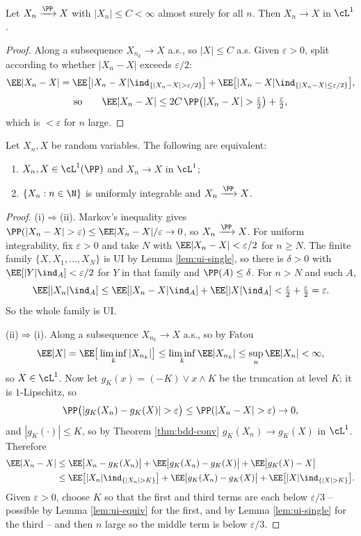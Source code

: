 \begin{theorem}\label{thm:bdd-conv}
	Let $X_n\xrightarrow{\PP}X$ with $|X_n| \leq C < \infty$ almost surely for all $n$. Then $X_n \to X$ in $\cL^1$.
\end{theorem}
\begin{proof}
	Along a subsequence $X_{n_k}\to X$ a.s., so $|X|\leq C$ a.s. Given $\varepsilon>0$, split according to whether $|X_n - X|$ exceeds $\varepsilon/2$:
	$$
	\EE|X_n - X| = \EE\big[|X_n-X|\ind_{\{|X_n-X|>\varepsilon/2\}}\big]+\EE\big[|X_n-X|\ind_{\{|X_n-X|\leq\varepsilon/2\}}\big],
	$$
	$$
	\text{so} \qquad \EE|X_n-X| \leq 2C\,\PP\big(|X_n-X|>\tfrac\varepsilon2\big)+\tfrac\varepsilon2,
	$$
	which is $<\varepsilon$ for $n$ large.
\end{proof}

\begin{theorem}\label{thm:vitali}
	Let $X_n, X$ be random variables. The following are equivalent:
	\begin{enumerate}[label=(\roman*)]
		\item $X_n, X \in \cL^1(\PP)$ and $X_n \to X$ in $\cL^1$;
		\item $\{X_n : n \in\N\}$ is uniformly integrable and $X_n \xrightarrow{\PP} X$.
	\end{enumerate}
\end{theorem}
\begin{proof}
	(i)$\Rightarrow$(ii). Markov's inequality gives $\PP(|X_n-X|>\varepsilon)\leq \EE|X_n-X|/\varepsilon\to0$, so $X_n\xrightarrow{\PP}X$. For uniform integrability, fix $\varepsilon>0$ and take $N$ with $\EE|X_n - X|<\varepsilon/2$ for $n \geq N$. The finite family $\{X, X_1,\dots,X_N\}$ is UI by Lemma \ref{lem:ui-single}, so there is $\delta>0$ with $\EE[|Y|\ind_A]<\varepsilon/2$ for $Y$ in that family and $\PP(A)\leq\delta$. For $n>N$ and such $A$,
	$$
	\EE[|X_n|\ind_A] \leq \EE[|X_n - X|\ind_A]+\EE[|X|\ind_A] < \tfrac\varepsilon2+\tfrac\varepsilon2 = \varepsilon.
	$$
	So the whole family is UI.

	(ii)$\Rightarrow$(i). Along a subsequence $X_{n_k}\to X$ a.s., so by Fatou
	$$
	\EE|X| = \EE\big[\liminf_k |X_{n_k}|\big]\leq\liminf_k \EE|X_{n_k}|\leq \sup_n \EE|X_n|<\infty,
	$$
	so $X \in \cL^1$. Now let $g_K(x) = (-K)\vee x \wedge K$ be the truncation at level $K$; it is $1$-Lipschitz, so
	$$
	\PP\big(|g_K(X_n)-g_K(X)|>\varepsilon\big)\leq \PP(|X_n - X|>\varepsilon)\to0,
	$$
	and $|g_K(\cdot)|\leq K$, so by Theorem \ref{thm:bdd-conv} $g_K(X_n)\to g_K(X)$ in $\cL^1$. Therefore
	\begin{align*}
		\EE|X_n - X| &\leq \EE\big|X_n - g_K(X_n)\big| + \EE\big|g_K(X_n)-g_K(X)\big|+\EE\big|g_K(X)-X\big|\\
		&\leq \EE\big[|X_n|\ind_{\{|X_n|>K\}}\big]+\EE\big|g_K(X_n)-g_K(X)\big|+\EE\big[|X|\ind_{\{|X|>K\}}\big].
	\end{align*}
	Given $\varepsilon>0$, choose $K$ so that the first and third terms are each below $\varepsilon/3$ -- possible by Lemma \ref{lem:ui-equiv} for the first, and by Lemma \ref{lem:ui-single} for the third -- and then $n$ large so the middle term is below $\varepsilon/3$.
\end{proof}

